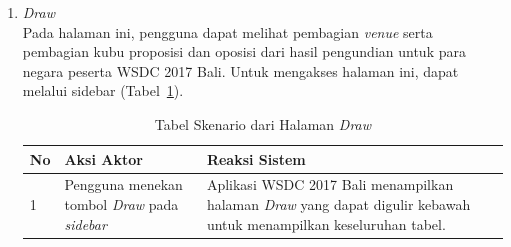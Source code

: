\begin{enumerate}
	\item {\it Draw} \\ 
	Pada halaman ini, pengguna dapat melihat pembagian {\it venue} serta pembagian kubu proposisi dan oposisi dari hasil pengundian untuk para negara peserta WSDC 2017 Bali. Untuk mengakses halaman ini, dapat melalui sidebar (Tabel~\ref{table:skenarioHalamanDraw}).
		\begin{table}[H]
			\centering
			\begin{tabular}{|p{0.5cm}|p{7cm}|p{7cm}|}
				\hline
				No & Aksi Aktor                               & Reaksi Sistem                                          \\ \hline
				1  & Pengguna menekan tombol \textit{Draw} pada \textit{sidebar} & Aplikasi WSDC 2017 Bali menampilkan halaman \textit{Draw} yang dapat digulir kebawah untuk menampilkan keseluruhan tabel. \\ \hline
			\end{tabular}
			\caption{Tabel Skenario dari Halaman {\it Draw}}
			\label{table:skenarioHalamanDraw}
		\end{table}
	

\end{enumerate}
